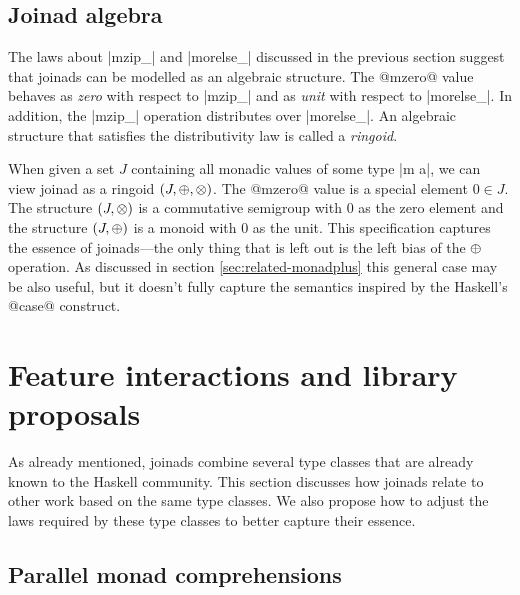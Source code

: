 \documentclass[preprint]{sigplanconf}
\begin{document}

\subsection{Joinad algebra} 
\label{sec:theory-algebra}

The laws about |mzip_| and |morelse_| discussed in the previous section suggest that 
joinads can be modelled as an algebraic structure. The @mzero@ value behaves as \textit{zero}
with respect to |mzip_| and as \textit{unit} with respect to |morelse_|. In addition, the
|mzip_| operation distributes over |morelse_|. An algebraic structure that satisfies the 
distributivity law is called a \textit{ringoid}.

When given a set $J$ containing all monadic values of some type |m a|, we can view joinad as a 
ringoid $(J, \oplus, \otimes)$. The @mzero@ value is a special element $0 \in J$.
The structure $(J, \otimes)$ is a commutative semigroup with $0$ as the zero element and the
structure $(J, \oplus)$ is a monoid with $0$ as the unit. This specification captures the 
essence of joinads---the only thing that is left out is the left bias of the $\oplus$ 
operation. As discussed in section \ref{sec:related-monadplus} this general case may be also 
useful, but it doesn't fully capture the semantics inspired by the Haskell's @case@ construct.


\section{Feature interactions and library proposals}
\label{sec:proposals}

As already mentioned, joinads combine several type classes that are already known to the Haskell 
community. This section discusses how joinads relate to other work based on the same type classes. 
We also propose how to adjust the laws required by these type classes to better capture their 
essence.


\subsection{Parallel monad comprehensions}
\label{sec:proposals-monadzip}
\end{document}
